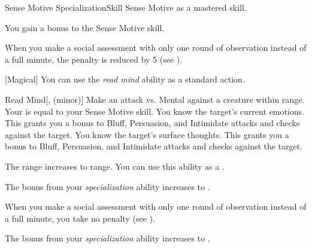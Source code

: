     \begin{feat}{Sense Motive Specialization}{Skill}
        \featpre Sense Motive as a mastered skill.

         You gain a  bonus to the Sense Motive skill.

         When you make a social assessment with only one round of observation instead of a full minute, the penalty is reduced by 5 (see ).

        [Magical] You can use the \textit{read mind} ability as a standard action.
        \begin{freeability}{Read Mind}[,  (minor)]
            Make an attack vs. Mental against a creature within \rngclose range.
            Your  is equal to your Sense Motive skill.
            \hit You know the target's current emotions.
            This grants you a  bonus to Bluff, Persuasion, and Intimidate attacks and checks against the target.
            \crit You know the target's surface thoughts.
            This grants you a  bonus to Bluff, Persuasion, and Intimidate attacks and checks against the target.

            \rankline
             The range increases to \rnglong range.
             You can use this ability as a .
        \end{freeability}

         The bonus from your \textit{specialization} ability increases to .

         When you make a social assessment with only one round of observation instead of a full minute, you take no penalty (see ).

         The bonus from your \textit{specialization} ability increases to .

    \end{feat}

